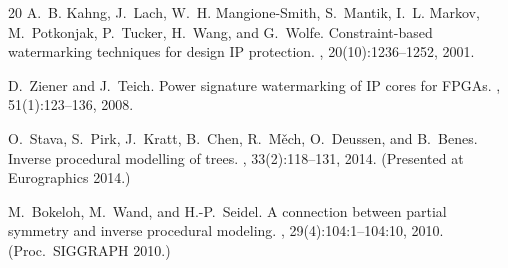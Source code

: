 \documentclass[11pt]{article}
\begin{document}
\begin{thebibliography}{20}
A.~B. Kahng, J.~Lach, W.~H. Mangione-Smith, S.~Mantik, I.~L. Markov,
  M.~Potkonjak, P.~Tucker, H.~Wang, and G.~Wolfe.
\newblock Constraint-based watermarking techniques for design IP
  protection.
, 20(10):1236--1252, 2001.

D.~Ziener and J.~Teich.
\newblock Power signature watermarking of IP cores for FPGAs.
, 51(1):123--136,
  2008.

O.~Stava, S.~Pirk, J.~Kratt, B.~Chen, R.~M{\v{e}}ch, O.~Deussen, and
  B.~Benes.
\newblock Inverse procedural modelling of trees.
, 33(2):118--131, 2014.  (Presented
  at Eurographics 2014.)

M.~Bokeloh, M.~Wand, and H.-P.~Seidel.
\newblock A connection between partial symmetry and inverse procedural
  modeling.
, 29(4):104:1--104:10, 2010.
  (Proc.\ SIGGRAPH 2010.)

\end{thebibliography}
\end{document}
